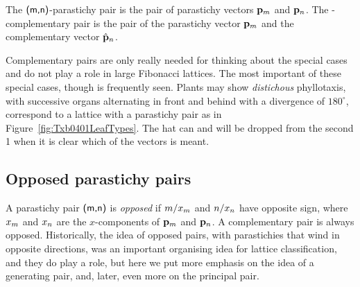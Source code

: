 \begin{definition}
The $\textsf{(m,n)}$-parastichy pair is the pair of parastichy vectors ${\mathbf p}_{m}$ and ${\mathbf p}_{n}$.
The -complementary pair is the pair of the parastichy vector ${\mathbf p}_{m}$ and the complementary vector $\hat{\mathbf p}_{n}$.
\label{def:pp}
\end{definition}
Complementary pairs are only really needed for thinking about the special cases  and do not play a role in large Fibonacci lattices. The most important of these special cases, though is frequently seen. Plants may show \textit{distichous} phyllotaxis, with successive organs  alternating in front and behind with a divergence of $180^\circ$, correspond to a lattice with a  parastichy pair as in Figure~\ref{fig:Txb0401LeafTypes}. The  hat can and will be dropped from the second \textsf{1} when it is clear which of the vectors is meant. 

\clearpage
\subsection{Opposed parastichy pairs}

A parastichy pair $\textsf{(m,n)}$ is \emph{opposed} if $m/x_m$ and $n/x_n$ have opposite sign, where $x_m$ and $x_n$ are the $x$-components of ${\mathbf p}_{m}$ and ${\mathbf p}_{n}$. A complementary pair  is always opposed. 
 Historically, the idea of opposed pairs, with parastichies that wind in opposite directions, was an important organising idea for lattice classification, and they do play a role, but here we put more emphasis on the idea of a {generating pair}, and, later,  even more on the principal pair. 




